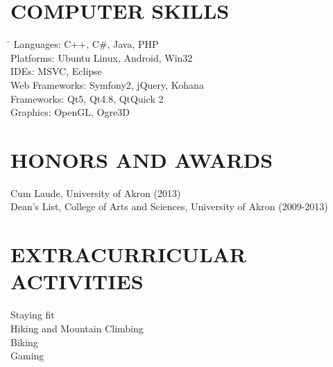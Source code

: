 \documentclass{res}
\begin{document}
\begin{resume}
\section{COMPUTER SKILLS}
  \vspace{-0.1in}
  \begin{tabbing}
  \hspace{2.3in} \= \kill
  Languages: \>  C++, C\#, Java, PHP \\
  Platforms: \> Ubuntu Linux, Android, Win32 \\
  IDEs: \> MSVC, Eclipse \\
  Web Frameworks: \> Symfony2, jQuery, Kohana \\
  Frameworks: \> Qt5, Qt4.8, QtQuick 2 \\
  Graphics: \> OpenGL, Ogre3D
  \end{tabbing}
\section{HONORS AND AWARDS}          
    Cum Laude, University of Akron (2013) \\
    Dean's List, College of Arts and Sciences, University of Akron (2009-2013)         
 
\section{EXTRACURRICULAR ACTIVITIES}          
    Staying fit \\
    Hiking and Mountain Climbing \\
    Biking \\
    Gaming          
 
\end{resume}
\end{document}
